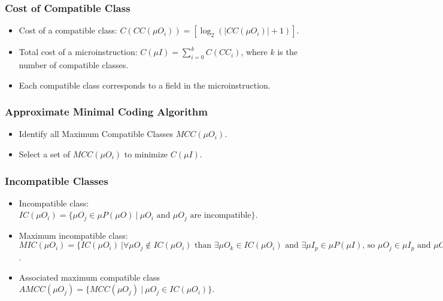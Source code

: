 \begin{frame}
    \frametitle{Cost of Compatible Class}
    \begin{itemize}
        \item Cost of a compatible class: $C(CC(\mu O_{i})) = [\log_{2}(|CC(\mu O_{i})| + 1)]$.
        \item Total cost of a microinstruction: $C(\mu I) = \sum_{i=0}^{k} C(CC_{i})$,
        where $k$ is the number of compatible classes.
        \item Each compatible class corresponds to a field in the microinstruction.
    \end{itemize}
\end{frame}

\begin{frame}
    \frametitle{Approximate Minimal Coding Algorithm}
    \begin{itemize}
        \item Identify all Maximum Compatible Classes $MCC(\mu O_{i})$.
        \item Select a set of $MCC(\mu O_{i})$ to minimize $C(\mu I)$.
    \end{itemize}
\end{frame}

\begin{frame}
    \frametitle{Incompatible Classes}
    \begin{itemize}
        \item Incompatible class: $IC(\mu O_{i}) = \{ \mu O_{j} \in \mu P(\mu O) \ | \ \mu O_{i} \text{ and } \mu O_{j} \text{ are incompatible}\}$.
        \item Maximum incompatible class: $MIC(\mu O_{i}) = \{ IC(\mu O_{i}) \ | \forall  \mu O_{j} \notin IC(\mu O_{i}) \text{ than } \exists \mu O_{k} \in IC(\mu O_{i}) \text{ and } \exists \mu I_{p} \in \mu P(\mu I) \text{, so } \mu O_{j} \in \mu I_{p} \text{ and } \mu O_{k} \in  \mu I_{p} \}$.
        \item Associated maximum compatible class $AMCC(\mu O_{j}) = \{ MCC(\mu O_{j}) \ | \ \mu O_{j} \in IC(\mu O_{i})\}$.
    \end{itemize}
    \note{
    }
\end{frame}

